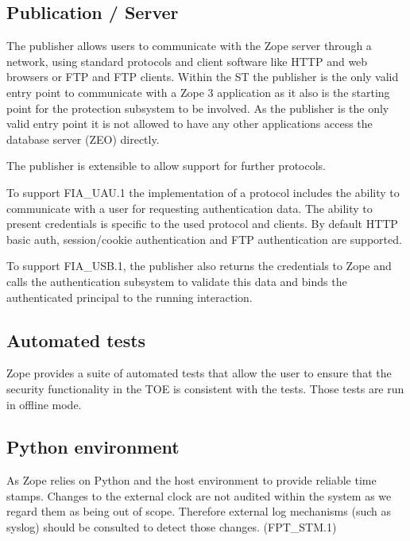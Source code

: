 \documentclass[12pt,english]{scrbook}
\begin{document}

\subsection{Publication / Server}

The publisher allows users to communicate with the Zope server through a
network, using standard protocols and client software like HTTP and web
browsers or FTP and FTP clients. Within the ST the publisher is the only valid
entry point to communicate with a Zope 3 application as it also is the
starting point for the protection subsystem to be involved. As the publisher
is the only valid entry point it is not allowed to have any other applications
access the database server (ZEO) directly.

The publisher is extensible to allow support for further protocols.

To support FIA{\_}UAU.1 the implementation of a protocol includes the ability
to communicate with a user for requesting authentication data. The ability to
present credentials is specific to the used protocol and clients. By default
HTTP basic auth, session/cookie authentication and FTP authentication are
supported.

To support FIA{\_}USB.1, the publisher also returns the credentials to Zope and
calls the authentication subsystem to validate this data and binds the
authenticated principal to the running interaction.



\subsection{Automated tests}

Zope provides a suite of automated tests that allow the user to ensure that the
security functionality in the TOE is consistent with the tests. Those tests are
run in offline mode.





\subsection{Python environment}

As Zope relies on Python and the host environment to provide reliable time
stamps. Changes to the external clock are not audited within the system as we
regard them as being out of scope.  Therefore external log mechanisms (such
as syslog) should be consulted to detect those changes. (FPT{\_}STM.1)
\end{document}
